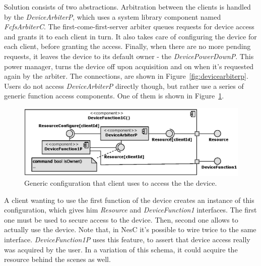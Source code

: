 Solution consists of two abstractions. Arbitration between the clients
is handled by the \emph{DeviceArbiterP}, which uses a system library
component named \emph{FcfsArbiterC}. The first-come-first-server
arbiter queues requests for device access and grants it to each client
in turn. It also takes care of configuring the device for each client,
before granting the access. Finally, when there are no more pending
requests, it leaves the device to its default owner - the
\emph{DevicePowerDownP}. This power manager, turns the device off upon
acquisition and  on when it's requested again by the arbiter.
The connections, are shown in Figure~\ref{fig:devicearbiterp}. Users do
not access \emph{DeviceArbiterP} directly though, but rather use a series of
generic function access components. One of them is shown in
Figure~\ref{fig:devicefunction1}.
\begin{figure}[h]
  \centering
  \includegraphics[width=1.0\textwidth]{diagrams/devicefunction1c.eps}
  \caption{Generic configuration that client uses to access the
  the device.}
  \label{fig:devicefunction1}
\end{figure}
A client wanting to use the first function of the device creates an
instance of this configuration, which gives him \emph{Resource} and
\emph{DeviceFunction1} interfaces. The first one must be used to
secure access to the device.  Then, second one allows to actually use
the device.  Note that, in NesC it's possible to wire twice to the
same interface.  \emph{DeviceFunction1P} uses this feature, to assert
that device access really was acquired by the user. In a variation of
this schema, it could acquire the resource behind the scenes as well.

